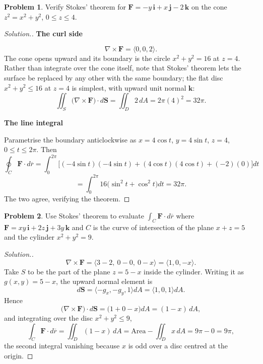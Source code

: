 \documentclass[11pt,a4paper]{article}
\theoremstyle{definition}
\newtheorem{problemx}{Problem}[subsection]
\newenvironment{problem}{\begin{problemx}}{\end{problemx}}
\newenvironment{solution}
  {\renewcommand{\qedsymbol}{}\begin{proof}[\textit{Solution}.]}
  {\end{proof}}
\newcommand{\subhead}[1]{%
  \par\medskip\noindent\textbf{#1}\par\nobreak\smallskip}
\begin{document}
\begin{problem}
Verify Stokes' theorem for
$\textbf{F} = -y\,\textbf{i} + x\,\textbf{j} - 2\,\textbf{k}$ on the cone
$z^2 = x^2+y^2$, $0\leq z\leq 4$.
\end{problem}
\begin{solution}
\subhead{The curl side}
$$\nabla\times\textbf{F} = \langle 0,0,2\rangle .$$
The cone opens upward and its boundary is the circle $x^2+y^2 = 16$ at $z=4$.
Rather than integrate over the cone itself, note that Stokes' theorem lets the
surface be replaced by any other with the same boundary; the flat disc
$x^2+y^2\leq 16$ at $z=4$ is simplest, with upward unit normal
$\textbf{k}$:
$$\iint_S\big(\nabla\times\textbf{F}\big)\cdot d\textbf{S}
= \iint_D 2\,dA = 2\pi(4)^2 = 32\pi .$$

\subhead{The line integral}
Parametrise the boundary anticlockwise as
$x = 4\cos t$, $y = 4\sin t$, $z = 4$, $0\leq t\leq 2\pi$. Then
$$\oint_C\textbf{F}\cdot d\overline{r}
= \int_0^{2\pi}\Big[(-4\sin t)(-4\sin t) + (4\cos t)(4\cos t)
+ (-2)(0)\Big]dt$$
$$= \int_0^{2\pi}16\big(\sin^2t+\cos^2t\big)dt = 32\pi .$$
The two agree, verifying the theorem.
\end{solution}

\begin{problem}
Use Stokes' theorem to evaluate
$\displaystyle{\int_C\textbf{F}\cdot d\overline{r}}$ where
$\textbf{F} = xy\,\textbf{i} + 2z\,\textbf{j} + 3y\,\textbf{k}$ and $C$ is the
curve of intersection of the plane $x+z = 5$ and the cylinder
$x^2+y^2 = 9$.
\end{problem}
\begin{solution}
$$\nabla\times\textbf{F}
= \big\langle 3-2,\ 0-0,\ 0-x\big\rangle = \langle 1, 0, -x\rangle .$$
Take $S$ to be the part of the plane $z = 5-x$ inside the cylinder. Writing it
as $g(x,y) = 5-x$, the upward normal element is
$$d\textbf{S} = \langle -g_x, -g_y, 1\rangle dA = \langle 1, 0, 1\rangle dA .$$
Hence
$$\big(\nabla\times\textbf{F}\big)\cdot d\textbf{S}
= \big(1 + 0 - x\big)dA = (1-x)\,dA ,$$
and integrating over the disc $x^2+y^2\leq 9$,
$$\int_C\textbf{F}\cdot d\overline{r} = \iint_D(1-x)\,dA
= \text{Area} - \iint_D x\,dA = 9\pi - 0 = 9\pi ,$$
the second integral vanishing because $x$ is odd over a disc centred at the
origin.
\end{solution}
\end{document}
